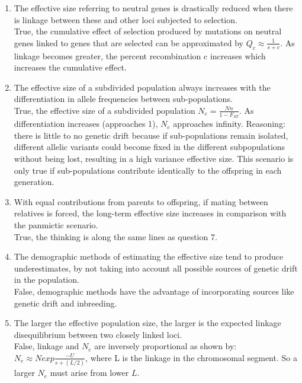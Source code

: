 \documentclass[12pt]{amsart}
\begin{document}
\begin{enumerate}
\item The effective size referring to neutral genes is drastically reduced when there is linkage between these and other loci subjected to selection.\\
True, the cumulative effect of selection produced by mutations on neutral genes linked to genes that are selected can be approximated by $Q_c \approx \frac{1}{s+c}$. As linkage becomes greater, the percent recombination c increases which increases the cumulative effect.\\
\item The effective size of a subdivided population always increases with the differentiation in allele frequencies between sub-populations.\\
True, the effective size of a subdivided population $N_e = \frac{Nn}{1-F_{ST}}$. As differentiation increases (approaches 1), $N_e$ approaches infinity. Reasoning: there is little to no genetic drift because if sub-populations remain isolated, different allelic variants could become fixed in the different subpopulations without being lost, resulting in a high variance effective size. This scenario is only true if sub-populations contribute identically to the offspring in each generation. 
\item With equal contributions from parents to offspring, if mating between relatives is forced, the long-term effective size increases in comparison with the panmictic scenario.\\
True, the thinking is along the same lines as question 7. 
\item The demographic methods of estimating the effective size tend to produce underestimates, by not taking into account all possible sources of genetic drift in the population.\\
False, demographic methods have the advantage of incorporating sources like genetic drift and inbreeding. \\
\item The larger the effective population size, the larger is the expected linkage disequilibrium between two closely linked loci.\\
False, linkage and $N_e$ are inversely proportional as shown by: $N_e \approx N exp\frac{-U}{s + (L/2)}$, where L is the linkage in the chromosomal segment. So a larger $N_e$ must arise from lower $L$.
\end{enumerate}

\medskip
\end{document}
